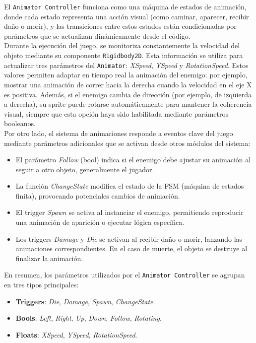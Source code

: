 El \texttt{Animator Controller} funciona como una máquina de estados de animación, donde cada estado representa una acción visual (como caminar, aparecer, recibir daño o morir), y las transiciones entre estos estados están condicionadas por parámetros que se actualizan dinámicamente desde el código.\\

Durante la ejecución del juego, se monitoriza constantemente la velocidad del objeto mediante su componente \texttt{Rigidbody2D}. Esta información se utiliza para actualizar tres parámetros del \texttt{Animator}: \textit{XSpeed}, \textit{YSpeed} y \textit{RotationSpeed}. Estos valores permiten adaptar en tiempo real la animación del enemigo: por ejemplo, mostrar una animación de correr hacia la derecha cuando la velocidad en el eje X es positiva. Además, si el enemigo cambia de dirección (por ejemplo, de izquierda a derecha), su sprite puede rotarse automáticamente para mantener la coherencia visual, siempre que esta opción haya sido habilitada mediante parámetros booleanos.\\

Por otro lado, el sistema de animaciones responde a eventos clave del juego mediante parámetros adicionales que se activan desde otros módulos del sistema:

\begin{itemize}
	\item El parámetro \textit{Follow} (bool) indica si el enemigo debe ajustar su animación al seguir a otro objeto, generalmente el jugador.
	\item La función \textit{ChangeState} modifica el estado de la FSM (máquina de estados finita), provocando potenciales cambios de animación.
	\item El trigger \textit{Spawn} se activa al instanciar el enemigo, permitiendo reproducir una animación de aparición o ejecutar lógica específica.
	\item Los triggers \textit{Damage} y \textit{Die} se activan al recibir daño o morir, lanzando las animaciones correspondientes. En el caso de muerte, el objeto se destruye al finalizar la animación.
\end{itemize}

En resumen, los parámetros utilizados por el \texttt{Animator Controller} se agrupan en tres tipos principales:

\begin{itemize}
	\item \textbf{Triggers}: \textit{Die}, \textit{Damage}, \textit{Spawn}, \textit{ChangeState}.
	\item \textbf{Bools}: \textit{Left}, \textit{Right}, \textit{Up}, \textit{Down}, \textit{Follow}, \textit{Rotating}.
	\item \textbf{Floats}: \textit{XSpeed}, \textit{YSpeed}, \textit{RotationSpeed}.
\end{itemize}

